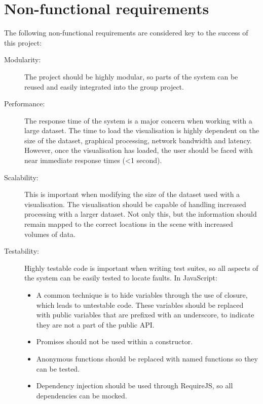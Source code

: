 

\section{Non-functional requirements} {
\label{sec:non_functiona_requirements}

	The following non-functional requirements are considered key to the success of this project:

	\begin{description}
		\item[Modularity:] The project should be highly modular, so parts of the system can be reused and easily integrated into the group project.
		\item[Performance:] The response time of the system is a major concern when working with a large dataset. The time to load the visualisation is highly dependent on the size of the dataset, graphical processing, network bandwidth and latency. However, once the visualisation has loaded, the user should be faced with near immediate response times (\textless 1 second).
		\item[Scalability:] This is important when modifying the size of the dataset used with a visualisation. The visualisation should be capable of handling increased processing with a larger dataset. Not only this, but the information should remain mapped to the correct locations in the scene with increased volumes of data.
		\item[Testability:] Highly testable code is important when writing test suites, so all aspects of the system can be easily tested to locate faults. In JavaScript:
			\begin{itemize}
				\item A common technique is to hide variables through the use of closure, which leads to untestable code. These variables should be replaced with public variables that are prefixed with an underscore, to indicate they are not a part of the public API.
				\item Promises should not be used within a constructor.
				\item Anonymous functions should be replaced with named functions so they can be tested.
				\item Dependency injection should be used through RequireJS, so all dependencies can be mocked.
			\end{itemize}
	\end{description}

}

